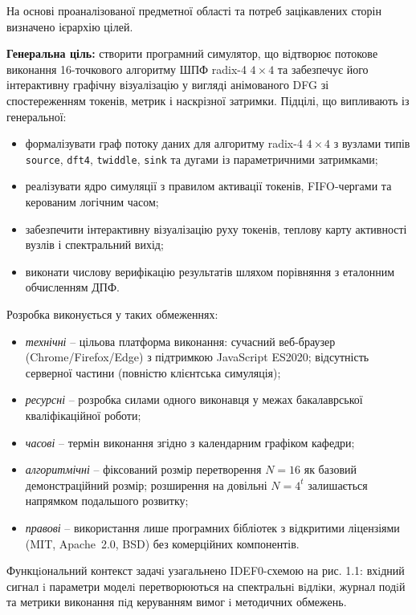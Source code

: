 \documentclass[
]{article}
\begin{document}
На основі проаналізованої предметної області та потреб зацікавлених
сторін визначено ієрархію цілей.

\textbf{Генеральна ціль:} створити програмний симулятор, що відтворює
потокове виконання 16-точкового алгоритму ШПФ radix-4 \(4 \times 4\) та
забезпечує його інтерактивну графічну візуалізацію у вигляді анімованого
DFG зі спостереженням токенів, метрик і наскрізної затримки. Підцілі, що
випливають із генеральної:

\begin{itemize}
\item
  формалізувати граф потоку даних для алгоритму radix-4 \(4 \times 4\) з
  вузлами типів \texttt{source}, \texttt{dft4}, \texttt{twiddle},
  \texttt{sink} та дугами із параметричними затримками;
\item
  реалізувати ядро симуляції з правилом активації токенів, FIFO-чергами
  та керованим логічним часом;
\item
  забезпечити інтерактивну візуалізацію руху токенів, теплову карту
  активності вузлів і спектральний вихід;
\item
  виконати числову верифікацію результатів шляхом порівняння з еталонним
  обчисленням ДПФ.
\end{itemize}

Розробка виконується у таких обмеженнях:

\begin{itemize}
\item
  \emph{технічні} -- цільова платформа виконання: сучасний веб-браузер
  (Chrome/Firefox/Edge) з підтримкою JavaScript ES2020; відсутність
  серверної частини (повністю клієнтська симуляція);
\item
  \emph{ресурсні} -- розробка силами одного виконавця у межах
  бакалаврської кваліфікаційної роботи;
\item
  \emph{часові} -- термін виконання згідно з календарним графіком
  кафедри;
\item
  \emph{алгоритмічні} -- фіксований розмір перетворення \(N = 16\) як
  базовий демонстраційний розмір; розширення на довільні \(N = 4^{t}\)
  залишається напрямком подальшого розвитку;
\item
  \emph{правові} -- використання лише програмних бібліотек з відкритими
  ліцензіями (MIT, Apache~2.0, BSD) без комерційних компонентів.
\end{itemize}

Функцiональний контекст задачi узагальнено IDEF0-схемою на рис. 1.1:
вхiдний сигнал i параметри моделi перетворюються на спектральнi вiдлiки,
журнал подiй та метрики виконання пiд керуванням вимог i методичних
обмежень.
\end{document}
